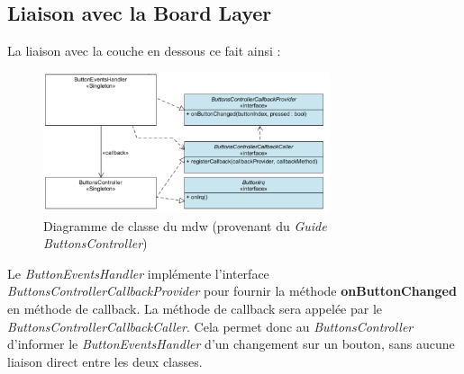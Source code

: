 \subsection{Liaison avec la Board Layer}
La liaison avec la couche en dessous ce fait ainsi :
\begin{figure}[H]
    \centering
    \includegraphics[width=0.75\textwidth]{Images/buttons/mdw_layer.PNG}
    \caption[Full UML]{Diagramme de classe du mdw (provenant du \emph{Guide ButtonsController}\footnotemark[1])}
\end{figure}
Le \emph{ButtonEventsHandler} implémente l'interface \emph{ButtonsControllerCallbackProvider}
pour fournir la méthode \textbf{onButtonChanged} en méthode de callback.
La méthode de callback sera appelée par le \emph{ButtonsControllerCallbackCaller}.
Cela permet donc au \emph{ButtonsController} d'informer le \emph{ButtonEventsHandler}
d'un changement sur un bouton, sans aucune liaison direct entre les deux classes.
\newpage

